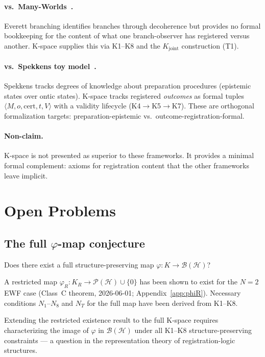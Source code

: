 \documentclass[12pt,a4paper]{article}
\theoremstyle{plain}
\theoremstyle{definition}
\theoremstyle{remark}
\newcommand{\Kjoint}{K_{\mathrm{joint}}}
\newcommand{\bk}[1]{\langle #1 \rangle}
\begin{document}
\paragraph{vs.\ Many-Worlds~\cite{Everett1957}.}
Everett branching identifies branches through decoherence but provides no
formal bookkeeping for the content of what one branch-observer has
registered versus another. K-space supplies this via K1--K8 and the
$\Kjoint$ construction (T1).

\paragraph{vs.\ Spekkens toy model~\cite{Spekkens2007}.}
Spekkens tracks degrees of knowledge about preparation procedures
(epistemic states over ontic states). K-space tracks registered
\emph{outcomes} as formal tuples $\bk{M,o,\mathrm{cert},t,V}$ with a
validity lifecycle (K4$\to$K5$\to$K7). These are orthogonal formalization
targets: preparation-epistemic vs.\ outcome-registration-formal.

\paragraph{Non-claim.}
K-space is not presented as superior to these frameworks. It provides a
minimal formal complement: axioms for registration content that the
other frameworks leave implicit.

\section{Open Problems}
\label{sec:open}

\subsection{The full $\varphi$-map conjecture}
\label{open:phi}

\begin{description}[leftmargin=0pt]
\item[\textit{Conjecture.}]
Does there exist a full structure-preserving map
$\varphi\colon K \to \mathcal{B}(\mathcal{H})$?

\item[\textit{Partial result.}]
A restricted map $\varphi_R\colon K_R \to \mathcal{P}(\mathcal{H})\cup\{0\}$
has been shown to exist for the $N=2$ EWF case (Class~C theorem, 2026-06-01;
Appendix~\ref{app:phiR}). Necessary conditions $N_1$--$N_8$ and $N_T$ for
the full map have been derived from K1--K8.

\item[\textit{Why open.}]
Extending the restricted existence result to the full K-space requires
characterizing the image of $\varphi$ in $\mathcal{B}(\mathcal{H})$ under
all K1--K8 structure-preserving constraints --- a question in the
representation theory of registration-logic structures.
\end{description}
\end{document}
